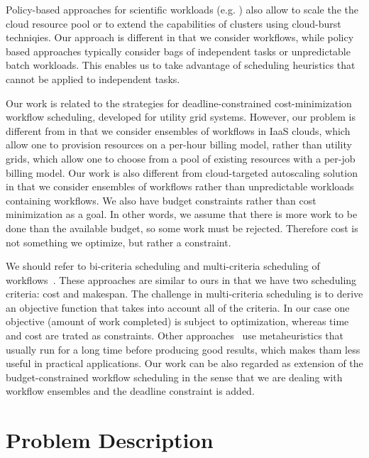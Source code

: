 \documentclass{sig-alternate}
\begin{document}
Policy-based approaches for scientific workloads (e.g. \cite{Marshall2010,
Kim2011}) also allow to scale the the cloud resource pool or to extend the
capabilities of clusters using cloud-burst techniqies. Our approach is different
in that we consider workflows, while policy based approaches typically consider
bags of independent tasks or unpredictable batch workloads. This enables us to
take advantage of scheduling heuristics that cannot be applied to independent
tasks.


Our work is related to the strategies for deadline-constrained cost-minimization
workflow scheduling, developed for utility grid systems. However, our problem is
different from \cite{Yu2005, Abrishami2010} in that we consider ensembles of workflows in
IaaS clouds, which allow one to provision resources on a per-hour billing model,
rather than utility grids, which allow one to choose from a pool of existing
resources with a per-job billing model. Our work is also different from
cloud-targeted autoscaling solution~\cite{Mao2011} in that we consider ensembles
of workflows rather than unpredictable workloads containing workflows. We also have budget constraints
rather than cost minimization as a goal. In other words, we assume that there is
more work to be done than the available budget, so some work must be rejected.
Therefore cost is not something we optimize, but rather a constraint.


We should refer to bi-criteria scheduling and multi-criteria scheduling of
workflows~\cite{Wieczorek2009,Prodan10,Dongarra2007}. These approaches are
similar to ours in that we have two scheduling criteria: cost and makespan. The
challenge in multi-criteria scheduling is to derive an objective function that
takes into account all of the criteria. In our case one objective (amount
of work completed) is subject to optimization, whereas time and cost are
trated as constraints. Other approaches~\cite{Talukder2009,Pandey2010} use
metaheuristics that usually run for a long time before producing good results,
which makes tham less useful in practical applications. Our work can be also
regarded as extension of the budget-constrained workflow scheduling
\cite{Sakellariou2007} in the sense that we are dealing with workflow ensembles
and the deadline constraint is added.
 
\section{Problem Description}
\label{sec:problem}
\end{document}
